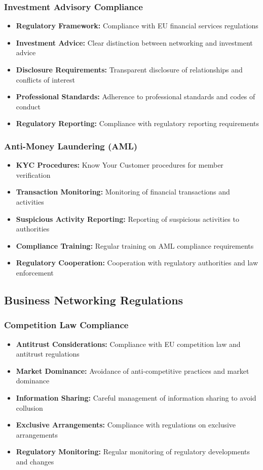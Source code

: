 \subsubsection{Investment Advisory Compliance}
\begin{itemize}
    \item \textbf{Regulatory Framework:} Compliance with EU financial services regulations
    \item \textbf{Investment Advice:} Clear distinction between networking and investment advice
    \item \textbf{Disclosure Requirements:} Transparent disclosure of relationships and conflicts of interest
    \item \textbf{Professional Standards:} Adherence to professional standards and codes of conduct
    \item \textbf{Regulatory Reporting:} Compliance with regulatory reporting requirements
\end{itemize}

\subsubsection{Anti-Money Laundering (AML)}
\begin{itemize}
    \item \textbf{KYC Procedures:} Know Your Customer procedures for member verification
    \item \textbf{Transaction Monitoring:} Monitoring of financial transactions and activities
    \item \textbf{Suspicious Activity Reporting:} Reporting of suspicious activities to authorities
    \item \textbf{Compliance Training:} Regular training on AML compliance requirements
    \item \textbf{Regulatory Cooperation:} Cooperation with regulatory authorities and law enforcement
\end{itemize}

\subsection{Business Networking Regulations}

\subsubsection{Competition Law Compliance}
\begin{itemize}
    \item \textbf{Antitrust Considerations:} Compliance with EU competition law and antitrust regulations
    \item \textbf{Market Dominance:} Avoidance of anti-competitive practices and market dominance
    \item \textbf{Information Sharing:} Careful management of information sharing to avoid collusion
    \item \textbf{Exclusive Arrangements:} Compliance with regulations on exclusive arrangements
    \item \textbf{Regulatory Monitoring:} Regular monitoring of regulatory developments and changes
\end{itemize}

